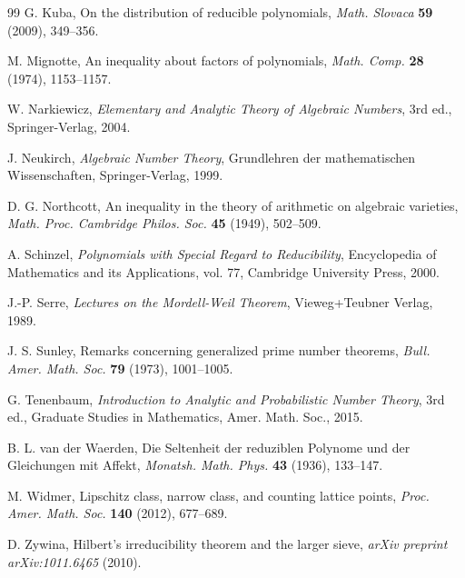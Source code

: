\documentclass[11pt,a4paper]{article}
\begin{document}
\begin{thebibliography}{99}
 G. Kuba, On the distribution of reducible polynomials, \textit{Math. Slovaca} \textbf{59} (2009), 349--356.

 M. Mignotte, An inequality about factors of polynomials, \textit{Math. Comp.} \textbf{28} (1974), 1153--1157.

 W. Narkiewicz, \textit{Elementary and Analytic Theory of Algebraic Numbers}, 3rd ed., Springer-Verlag, 2004.

 J. Neukirch, \textit{Algebraic Number Theory}, Grundlehren der mathematischen Wissenschaften, Springer-Verlag, 1999.

 D. G. Northcott, An inequality in the theory of arithmetic on algebraic varieties, \textit{Math. Proc. Cambridge Philos. Soc.} \textbf{45} (1949), 502--509.

 A. Schinzel, \textit{Polynomials with Special Regard to Reducibility}, Encyclopedia of Mathematics and its Applications, vol. 77, Cambridge University Press, 2000.

 J.-P. Serre, \textit{Lectures on the Mordell-Weil Theorem}, Vieweg+Teubner Verlag, 1989.

 J. S. Sunley, Remarks concerning generalized prime number theorems, \textit{Bull. Amer. Math. Soc.} \textbf{79} (1973), 1001--1005.

 G. Tenenbaum, \textit{Introduction to Analytic and Probabilistic Number Theory}, 3rd ed., Graduate Studies in Mathematics, Amer. Math. Soc., 2015.

 B. L. van der Waerden, Die Seltenheit der reduziblen Polynome und der Gleichungen mit Affekt, \textit{Monatsh. Math. Phys.} \textbf{43} (1936), 133--147.

 M. Widmer, Lipschitz class, narrow class, and counting lattice points, \textit{Proc. Amer. Math. Soc.} \textbf{140} (2012), 677--689.

 D. Zywina, Hilbert's irreducibility theorem and the larger sieve, \textit{arXiv preprint arXiv:1011.6465} (2010).

\end{thebibliography}
\end{document}

